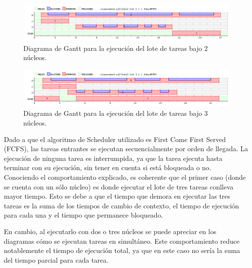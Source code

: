 \documentclass[a4paper]{article}
\begin{document}
 \begin{figure}[h!]
   \begin{center}
 	\includegraphics[scale=0.5]{imagenes/ej2/2core.png}
 	\caption{Diagrama de Gantt para la ejecuci\'on del lote de tareas bajo 2 n\'ucleos.}
   \end{center}
 \end{figure} 
 
  \newpage

  \begin{figure}[h!]
   \begin{center}
 	\includegraphics[scale=0.5]{imagenes/ej2/3core.png}
 	\caption{Diagrama de Gantt para la ejecuci\'on del lote de tareas bajo 3 n\'ucleos.}
   \end{center}
 \end{figure} 

 
 Dado a que el algoritmo de Scheduler utilizado es First Come First Served (FCFS), las tareas entrantes se ejecutan secuencialmente por orden de llegada. La ejecuci\'on de ninguna tarea es interrumpida, ya que la tarea ejecuta hasta terminar con su ejecuci\'on, sin tener en cuenta si est\'a bloqueada o no.\\

Conociendo el comportamiento explicado, es coherente que el primer caso (donde se cuenta con un s\'olo n\'ucleo) es donde ejecutar el lote de tres tareas conlleva mayor tiempo. Esto se debe a que el tiempo que demora en ejecutar las tres tareas es la suma de los tiempos de cambio de contexto, el tiempo de ejecuci\'on para cada una y el tiempo que permanece bloqueado.

En cambio, al ejecutarlo con dos o tres n\'ucleos se puede apreciar en los diagramas c\'omo se ejecutan tareas en simult\'aneo. Este comportamiento reduce notablemente el tiempo de ejecuci\'on total, ya que en este caso no ser\'ia la suma del tiempo parcial para cada tarea.\\
\end{document}
